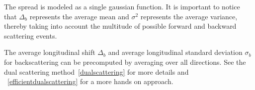 The spread is modeled as a single gaussian function. It is important to notice that $\Delta_b$ represents the average mean and $\sigma^2$ represents the average variance, thereby taking into account the multitude of possible forward and backward scattering events.

The average longitudinal shift $\Delta_b$ and average longitudinal standard deviation $\sigma_b$ for backscattering can be precomputed by averaging over all directions. See the dual scattering method~\ref{dualscattering} for more details and ~\ref{efficientdualscattering} for a more hands on approach.







